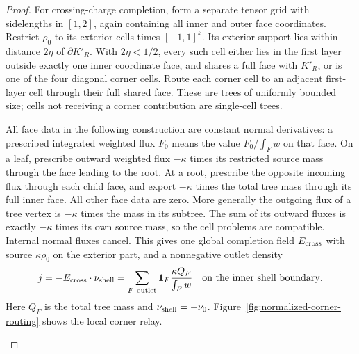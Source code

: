 \begin{proof}
For crossing-charge completion, form a separate tensor grid with
sidelengths in $[1,2]$, again containing all inner and outer face
coordinates.  Restrict $\rho_0$ to its exterior cells times
$[-1,1]^k$.  Its exterior support lies within distance $2\eta$ of
$\partial K'_R$.  With $2\eta<1/2$, every such cell either lies in
the first layer outside exactly one inner coordinate face, and shares
a full face with $K'_R$, or is one of the four diagonal corner cells.
Route each corner cell to an adjacent first-layer cell through their
full shared face.  These are trees of uniformly bounded size; cells
not receiving a corner contribution are single-cell trees.

All face data in the following construction are constant normal
derivatives: a prescribed integrated weighted flux $F_0$ means the value
$F_0/\int_Fw$ on that face. On a leaf, prescribe outward weighted flux $-\kappa$ times its
restricted source mass through the face leading to the root.  At a
root, prescribe the opposite incoming flux through each child face,
and export $-\kappa$ times the total tree mass through its full inner
face.  All other face data are zero.  More generally the outgoing
flux of a tree vertex is $-\kappa$ times the mass in its subtree.
The sum of its outward fluxes is exactly $-\kappa$ times its own
source mass, so the cell problems are compatible.  Internal normal
fluxes cancel.  This gives one global completion field $E_{\rm cross}$
with source $\kappa\rho_0$ on the exterior part, and a nonnegative
outlet density
\[
 j=-E_{\rm cross}\cdot\nu_{\rm shell}
   =\sum_{F\ {\rm outlet}}\mathbf1_F
                   \frac{\kappa Q_F}{\int_Fw}
       \quad\hbox{on the inner shell boundary}.
\]
Here $Q_F$ is the total tree mass and $\nu_{\rm shell}=-\nu_0$.
Figure~\ref{fig:normalized-corner-routing} shows the local corner relay.

\begin{figure}[tb]
\centering
{}
\end{figure}
\end{proof}

